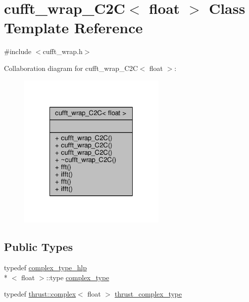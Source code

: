 \hypertarget{classcufft__wrap__C2C_3_01float_01_4}{\section{cufft\-\_\-wrap\-\_\-\-C2\-C$<$ float $>$ Class Template Reference}
\label{classcufft__wrap__C2C_3_01float_01_4}
}


{\ttfamily \#include $<$cufft\-\_\-wrap.\-h$>$}



Collaboration diagram for cufft\-\_\-wrap\-\_\-\-C2\-C$<$ float $>$\-:\nopagebreak
\begin{figure}[H]
\begin{center}
\leavevmode
\includegraphics[width=204pt]{classcufft__wrap__C2C_3_01float_01_4__coll__graph}
\end{center}
\end{figure}
\subsection*{Public Types}
\begin{DoxyCompactItemize}
\item 
typedef \hyperlink{structcomplex__type__hlp}{complex\-\_\-type\-\_\-hlp}\\*
$<$ float $>$\-::type \hyperlink{classcufft__wrap__C2C_3_01float_01_4_a5774ab38d74ec0c5e5f7c8e9f077b9e9}{complex\-\_\-type}
\item 
typedef \hyperlink{test__deflation__typedefs_8h_a25cabcac5deb559feab415e2c445d8ba}{thrust\-::complex}$<$ float $>$ \hyperlink{classcufft__wrap__C2C_3_01float_01_4_a6a0bfa6274f9445666985b5aef65f6c3}{thrust\-\_\-complex\-\_\-type}
\end{DoxyCompactItemize}
